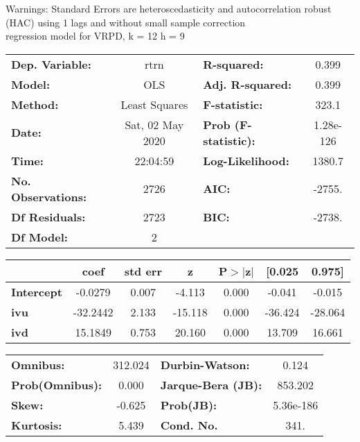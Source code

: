 Warnings: \newline
 [1] Standard Errors are heteroscedasticity and autocorrelation robust (HAC) using 1 lags and without small sample correction\\ 

regression model for VRPD, k = 12 h = 9\begin{center}
\begin{tabular}{lclc}
\toprule
\textbf{Dep. Variable:}    &       rtrn       & \textbf{  R-squared:         } &     0.399   \\
\textbf{Model:}            &       OLS        & \textbf{  Adj. R-squared:    } &     0.399   \\
\textbf{Method:}           &  Least Squares   & \textbf{  F-statistic:       } &     323.1   \\
\textbf{Date:}             & Sat, 02 May 2020 & \textbf{  Prob (F-statistic):} & 1.28e-126   \\
\textbf{Time:}             &     22:04:59     & \textbf{  Log-Likelihood:    } &    1380.7   \\
\textbf{No. Observations:} &        2726      & \textbf{  AIC:               } &    -2755.   \\
\textbf{Df Residuals:}     &        2723      & \textbf{  BIC:               } &    -2738.   \\
\textbf{Df Model:}         &           2      & \textbf{                     } &             \\
\bottomrule
\end{tabular}
\begin{tabular}{lcccccc}
                   & \textbf{coef} & \textbf{std err} & \textbf{z} & \textbf{P$> |$z$|$} & \textbf{[0.025} & \textbf{0.975]}  \\
\midrule
\textbf{Intercept} &      -0.0279  &        0.007     &    -4.113  &         0.000        &       -0.041    &       -0.015     \\
\textbf{ivu}       &     -32.2442  &        2.133     &   -15.118  &         0.000        &      -36.424    &      -28.064     \\
\textbf{ivd}       &      15.1849  &        0.753     &    20.160  &         0.000        &       13.709    &       16.661     \\
\bottomrule
\end{tabular}
\begin{tabular}{lclc}
\textbf{Omnibus:}       & 312.024 & \textbf{  Durbin-Watson:     } &     0.124  \\
\textbf{Prob(Omnibus):} &   0.000 & \textbf{  Jarque-Bera (JB):  } &   853.202  \\
\textbf{Skew:}          &  -0.625 & \textbf{  Prob(JB):          } & 5.36e-186  \\
\textbf{Kurtosis:}      &   5.439 & \textbf{  Cond. No.          } &      341.  \\
\bottomrule
\end{tabular}
\end{center}

